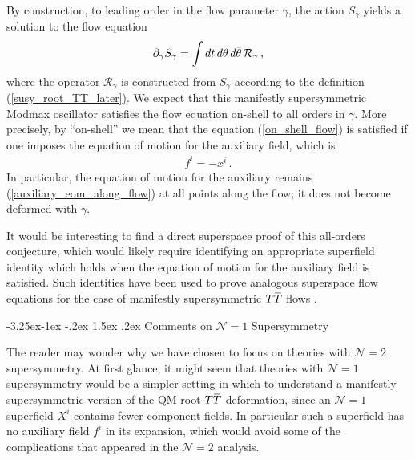 \documentclass[12pt]{article}
\makeatletter
\numberwithin{equation}{section}
\renewcommand\subsection{\@startsection{subsection}{2}{\z@}%
                                     {-3.25ex\@plus -1ex \@minus -.2ex}%
                                     {1.5ex \@plus .2ex}%
                                     {\normalfont\bfseries}}
\newcommand{\overbar}[1]{\mkern 1.5mu\overline{\mkern-1.5mu#1\mkern-1.5mu}\mkern 1.5mu}
\newcommand{\thetab}{\overbar{\theta}}
\def\TT{{T\overbar{T}}}
\makeatother
\begin{document}
By construction, to leading order in the flow parameter $\gamma$, the action $S_\gamma$ yields a solution to the flow equation
%
\begin{align}\label{on_shell_flow}
    \partial_\gamma S_\gamma = \int dt \, d \theta \, d \thetab \, \mathcal{R}_\gamma \, , 
\end{align}
%
where the operator $\mathcal{R}_\gamma$ is constructed from $S_\gamma$ according to the definition (\ref{susy_root_TT_later}). We expect that this manifestly supersymmetric Modmax oscillator satisfies the flow equation on-shell to all orders in $\gamma$. More precisely, by ``on-shell'' we mean that the equation (\ref{on_shell_flow}) is satisfied if one imposes the equation of motion for the auxiliary field, which is
%
\begin{align}\label{auxiliary_eom_along_flow}
    f^i = - x^i \, .
\end{align}
%
In particular, the equation of motion for the auxiliary remains (\ref{auxiliary_eom_along_flow}) at all points along the flow; it does not become deformed with $\gamma$.

It would be interesting to find a direct superspace proof of this all-orders conjecture, which would likely require identifying an appropriate superfield identity which holds when the equation of motion for the auxiliary field is satisfied. Such identities have been used to prove analogous superspace flow equations for the case of manifestly supersymmetric $\TT$ flows \cite{Chang:2019kiu,Ferko:2019oyv}.

\subsection{Comments on $\mathcal{N} = 1$ Supersymmetry}

The reader may wonder why we have chosen to focus on theories with $\mathcal{N} = 2$ supersymmetry. At first glance, it might seem that theories with $\mathcal{N} = 1$ supersymmetry would be a simpler setting in which to understand a manifestly supersymmetric version of the QM-root-$\TT$ deformation, since an $\mathcal{N} = 1$ superfield $X^i$ contains fewer component fields. In particular such a superfield has no auxiliary field $f^i$ in its expansion, which would avoid some of the complications that appeared in the $\mathcal{N} = 2$ analysis.
\end{document}
